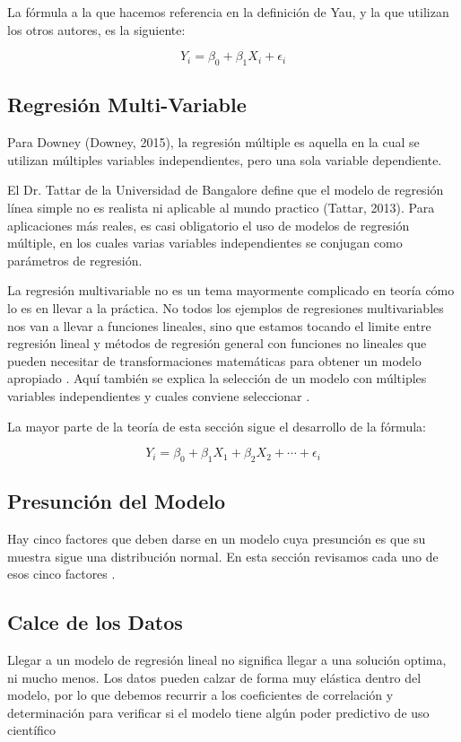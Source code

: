 La fórmula a la que hacemos referencia en la definición de Yau, y la que utilizan los otros autores, es la siguiente:

\[Y_{i} = \beta_{0} + \beta_{1}X_{i} + \epsilon_{i}\]



\subsection{Regresión Multi-Variable}
Para Downey (Downey, 2015), la regresión múltiple es aquella en la cual se utilizan múltiples variables independientes, pero una sola variable dependiente. 

El Dr. Tattar de la Universidad de Bangalore define que el modelo de regresión línea simple no es realista ni aplicable al mundo practico (Tattar, 2013). Para aplicaciones más reales, es casi obligatorio el uso de modelos de regresión múltiple, en los cuales varias variables independientes se conjugan como parámetros de regresión. 

La regresión multivariable no es un tema mayormente complicado en teoría cómo lo es en llevar a la práctica. No todos los ejemplos de regresiones multivariables nos van a llevar a funciones lineales, sino que estamos tocando el limite entre regresión lineal y métodos de regresión general con funciones no lineales que pueden necesitar de transformaciones matemáticas para obtener un modelo apropiado \cite{daroczi}. Aquí también se explica la selección de un modelo con múltiples variables independientes y cuales conviene seleccionar \cite{viswanathan}.

La mayor parte de la teoría de esta sección sigue el desarrollo de la fórmula:

\[Y_{i} = \beta_{0} + \beta_{1}X_{1} + \beta_{2}X_{2} + \cdots + \epsilon_{i}\]

\subsection{Presunción del Modelo}
Hay cinco factores que deben darse en un modelo cuya presunción es que su muestra sigue una distribución normal. En esta sección revisamos cada uno de esos cinco factores \cite{daroczi}.

\subsection{Calce de los Datos}
Llegar a un modelo de regresión lineal no significa llegar a una solución optima, ni mucho menos. Los datos pueden calzar de forma muy elástica dentro del modelo, por lo que debemos recurrir a los coeficientes de correlación y determinación para verificar si el modelo tiene algún poder predictivo de uso científico

